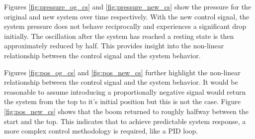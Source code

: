 Figures \ref{fig:pressure_og_cs} and \ref{fig:pressure_new_cs} show the pressure for the original and new system over time respectively. With the new control signal, the system pressure does not behave reciprocally and experiences a significant drop initially. The oscillation after the system has reached a resting state is then approximately reduced by half. This provides insight into the non-linear relationship between the control signal and the system behavior.


Figures \ref{fig:pos_og_cs} and \ref{fig:pos_new_cs} further highlight the non-linear relationship between the control signal and the system behavior. It would be reasonable to assume introducing a proportionally negative signal would return the system from the top to it's initial position but this is not the case. Figure \ref{fig:pos_new_cs} shows that the boom returned to roughly halfway between the start and the top. This indicates that to achieve predictable system response, a more complex control methodology is required, like a PID loop.

